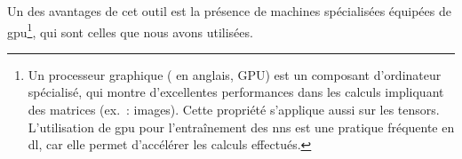 Un des avantages de cet outil est la présence de machines spécialisées équipées de \gls{gpu}\footnote{Un processeur graphique ( en anglais, GPU) est un composant d'ordinateur spécialisé, qui montre d'excellentes performances dans les calculs impliquant des \glspl{matrice} (ex.~: images). Cette propriété s'applique aussi sur les \glspl{tensor}. L'utilisation de \gls{gpu} pour l'entraînement des \glspl{nn} est une pratique fréquente en \gls{dl}, car elle permet d'accélérer les calculs effectués.\label{def:gpu}}, qui sont celles que nous avons utilisées.